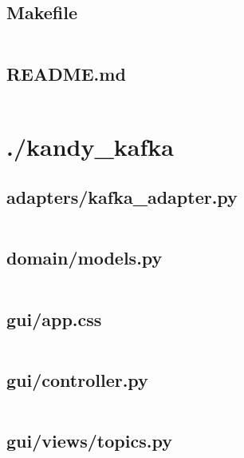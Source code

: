 \documentclass[10pt , a4paper]{report}
\newenvironment{code}{\captionsetup{type=listing}}{}
\begin{document}
\subsection{Makefile}
\begin{code}
  \inputminted[fontsize=\small]{make}{../Makefile}
\end{code}

\subsection{README.md}
\begin{code}
  \inputminted[fontsize=\small]{MarkDown}{../README.md}
\end{code}

\newpage
\section{./kandy\_kafka}
\subsection{adapters/kafka\_adapter.py}
\begin{code}
  \inputminted[fontsize=\small]{Python}{../kandy_kafka/adapters/kafka_adapter.py}
\end{code}

\subsection{domain/models.py}
\begin{code}
  \inputminted[fontsize=\small]{Python}{../kandy_kafka/domain/models.py}
\end{code}

\subsection{gui/app.css}
\begin{code}
  \inputminted[fontsize=\small]{text}{../kandy_kafka/gui/app.css}
\end{code}

\subsection{gui/controller.py}
\begin{code}
  \inputminted[fontsize=\small]{Python}{../kandy_kafka/gui/controller.py}
\end{code}

\subsection{gui/views/topics.py}
\begin{code}
  \inputminted[fontsize=\small]{Python}{../kandy_kafka/gui/views/topics.py}
\end{code}
\end{document}
